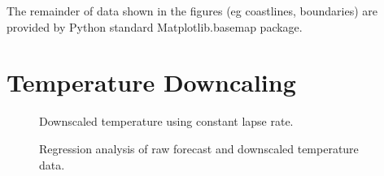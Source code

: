 \documentclass{article}
\begin{document}
The remainder of data shown in the figures (eg coastlines, boundaries) are provided by Python standard Matplotlib.basemap package. 

\section{Temperature Downcaling}
\begin{figure}
\caption{Downscaled temperature using constant lapse rate.}\label{demT2}
\end{figure}
\begin{figure}
\caption{Regression analysis of raw forecast and downscaled temperature data.}\label{scatterT2}
\end{figure}


% 
% 
\end{document}
